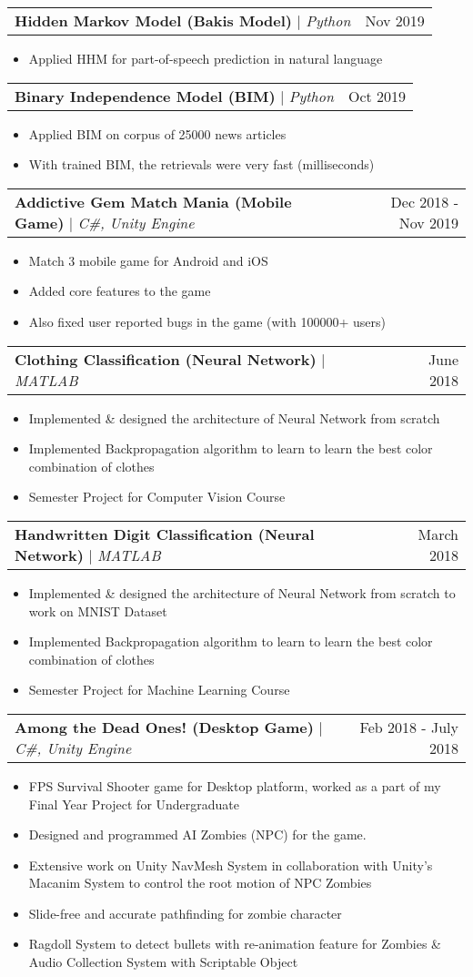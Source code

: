 \documentclass[letterpaper,11pt]{article}
\makeatletter
\newcommand{\resumeItem}[1]{
  \item\small{
    {#1 \vspace{-2pt}}
  }
}
\newcommand{\resumeProjectHeading}[2]{
    \item
    \begin{tabular*}{0.97\textwidth}{l@{\extracolsep{\fill}}r}
      \small#1 & #2 \\
    \end{tabular*}\vspace{-7pt}
}
\newcommand{\resumeItemListStart}{\begin{itemize}}
\newcommand{\resumeItemListEnd}{\end{itemize}\vspace{-5pt}}
\makeatother
\begin{document}
      \resumeProjectHeading
          {\textbf{Hidden Markov Model (Bakis Model)} $|$ \emph{Python}}{Nov 2019}
          \resumeItemListStart
            \resumeItem{Applied HHM for part-of-speech prediction in natural language}
          \resumeItemListEnd 

      \resumeProjectHeading
          {\textbf{Binary Independence Model (BIM)} $|$ \emph{Python}}{Oct 2019}
          \resumeItemListStart
            \resumeItem{Applied BIM on corpus of 25000 news articles}
            \resumeItem{With trained BIM, the retrievals were very fast (milliseconds)}
          \resumeItemListEnd 

      \resumeProjectHeading
          {\textbf{Addictive Gem Match Mania (Mobile Game)} $|$ \emph{C\#, Unity Engine}}{Dec 2018 - Nov 2019}
          \resumeItemListStart
            \resumeItem{Match 3 mobile game for Android and iOS}
            \resumeItem{Added core features to the game}
            \resumeItem{Also fixed user reported bugs in the game (with 100000+ users)}
          \resumeItemListEnd
          
      \resumeProjectHeading
          {\textbf{Clothing Classification (Neural Network)} $|$ \emph{MATLAB}}{June 2018}
          \resumeItemListStart
            \resumeItem{Implemented \& designed the architecture of Neural Network from scratch}
            \resumeItem{Implemented Backpropagation algorithm to learn to learn the best color combination of clothes}
            \resumeItem{Semester Project for Computer Vision Course}
          \resumeItemListEnd 

      \resumeProjectHeading
          {\textbf{Handwritten Digit Classification (Neural Network) } $|$ \emph{MATLAB}}{March 2018}
          \resumeItemListStart
            \resumeItem{Implemented \& designed the architecture of Neural Network from scratch to work on MNIST Dataset}
            \resumeItem{Implemented Backpropagation algorithm to learn to learn the best color combination of clothes}
            \resumeItem{Semester Project for Machine Learning Course}
          \resumeItemListEnd

      \resumeProjectHeading
          {\textbf{Among the Dead Ones! (Desktop Game)} $|$ \emph{C\#, Unity Engine}}{Feb 2018 - July 2018}
          \resumeItemListStart
            \resumeItem{FPS Survival Shooter game for Desktop platform, worked as a part of my Final Year Project for Undergraduate}
            \resumeItem{Designed and programmed AI Zombies (NPC) for the game.}
            \resumeItem{Extensive work on Unity NavMesh System in collaboration with Unity’s Macanim System to control the root motion of NPC Zombies}
            \resumeItem{Slide-free and accurate pathfinding for zombie character}
            \resumeItem{Ragdoll System to detect bullets with re-animation feature for Zombies \& Audio Collection System with Scriptable Object}
          \resumeItemListEnd 
\end{document}
